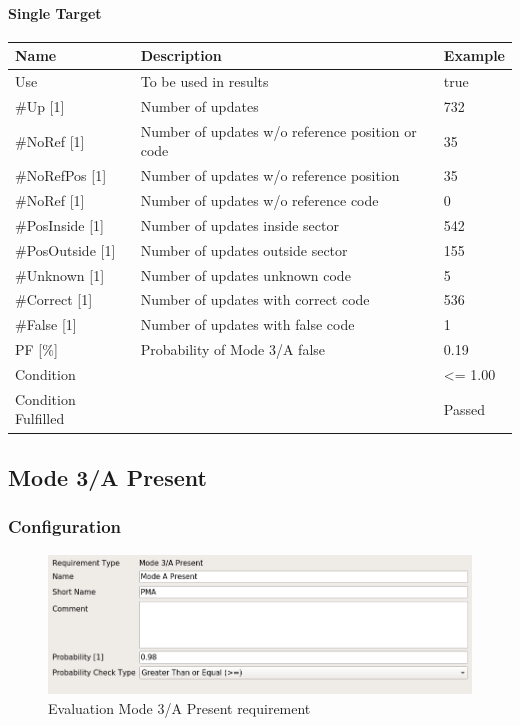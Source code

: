 \paragraph{Single Target}

\begin{center}
 \begin{table}[H]
  \begin{tabularx}{\textwidth}{ | l | X |  l | }
    \hline
    \textbf{Name} & \textbf{Description} & \textbf{Example} \\ \hline
    Use & To be used in results & true \\ \hline
    \#Up [1] & Number of updates & 732 \\ \hline
    \#NoRef [1] & Number of updates w/o reference position or code & 35 \\ \hline
    \#NoRefPos [1] & Number of updates w/o reference position  & 35 \\ \hline
    \#NoRef [1] & Number of updates w/o reference code & 0 \\ \hline
    \#PosInside [1] & Number of updates inside sector & 542 \\ \hline
    \#PosOutside [1] & Number of updates outside sector & 155 \\ \hline
    \#Unknown [1] & Number of updates unknown code & 5 \\ \hline
    \#Correct [1] & Number of updates with correct code & 536 \\ \hline
    \#False [1] & Number of updates with false code & 1 \\ \hline
    PF [\%] & Probability of Mode 3/A false & 0.19 \\ \hline
    Condition &  & <= 1.00 \\ \hline
    Condition Fulfilled &  & Passed \\ \hline
\end{tabularx}
\end{table}
\end{center}

\subsection{Mode 3/A Present}
\label{sec:eval_req_m3a_present} 

\subsubsection{Configuration}

\begin{figure}[H]
    \includegraphics[width=14cm,frame]{figures/eval_req_m3a_present.png}
  \caption{Evaluation Mode 3/A Present requirement}
\end{figure}

